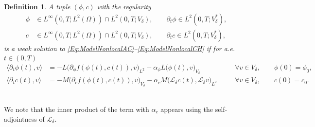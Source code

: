 \documentclass[]{article}
\newtheorem{definition}{Definition}[section]
\begin{document}
\begin{definition}\label{Def:Sol}
	A tuple $(\phi,c)$ with the regularity
	\[
	\begin{aligned}
		\phi&\in L^\infty(0,T;L^2(\Omega))
		\cap L^2(0,T;V_\delta),
		\qquad
		\partial_t\phi\in L^2(0,T;V_\delta^{*}), \\
		c&\in L^\infty(0,T;L^2(\Omega))
		\cap L^2(0,T;V_\delta),
		\qquad
		\partial_tc\in L^2(0,T;V_\delta^{*}),
	\end{aligned}
	\]
	is a \emph{weak solution} to \eqref{Eq:ModelNonlocalAC}--\eqref{Eq:ModelNonlocalCH} if for a.e.\ $t\in (0,T)$
	\begin{equation}\label{weakform}
		\begin{aligned}
			\langle\partial_t\phi(t),v\rangle
			&=-L \bigl(\partial_\phi f(\phi(t),c(t)),v\bigr)_{L^2}
			-\alpha_\phi L \bigl(\phi(t),v\bigr)_{V_\delta}
			&&\quad\forall v\in V_\delta,
			\qquad
			\phi(0)=\phi_0, \\
			\langle\partial_tc(t),v\rangle
			&=-M \bigl(\partial_c f(\phi(t),c(t)),v\bigr)_{V_\delta}-\alpha_c M\bigl(\mathcal{L}_\delta c(t),\mathcal{L}_\delta v\bigr)_{L^2}
			&&\quad\forall v\in V_\delta,
			\qquad
			c(0)=c_0.
		\end{aligned}
	\end{equation}
\end{definition}
\ \\
We note that the inner product of the term with $\alpha_c$ appears using the self-adjointness of $\mathcal{L}_\delta$. 
\end{document}

